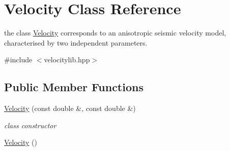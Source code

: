 \hypertarget{class_velocity}{}\section{Velocity Class Reference}
\label{class_velocity}


the class \hyperlink{class_velocity}{Velocity} corresponds to an anisotropic seismic velocity model, characterised by two independent parameters.  




{\ttfamily \#include $<$velocitylib.\+hpp$>$}

\subsection*{Public Member Functions}
\begin{DoxyCompactItemize}
\item 
\hyperlink{class_velocity_ad12087bb64c45d3f321cd4c8d5196c31}{Velocity} (const double \&, const double \&)
\begin{DoxyCompactList}\small\item\em class constructor \end{DoxyCompactList}\item 
\hypertarget{class_velocity_a852088c8d4dbb7e1beb0d793a57e9d11}{}\hyperlink{class_velocity_a852088c8d4dbb7e1beb0d793a57e9d11}{Velocity} ()\label{class_velocity_a852088c8d4dbb7e1beb0d793a57e9d11}


\end{DoxyCompactItemize}
